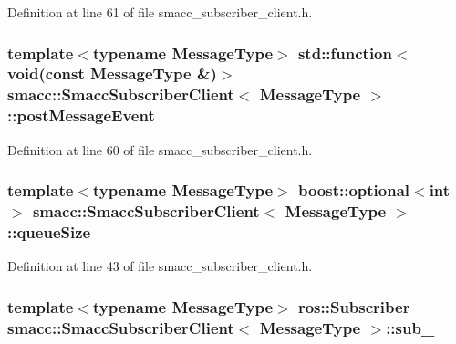 Definition at line 61 of file smacc\+\_\+subscriber\+\_\+client.\+h.

\subsubsection[{\texorpdfstring{post\+Message\+Event}{postMessageEvent}}]{\setlength{\rightskip}{0pt plus 5cm}template$<$typename Message\+Type$>$ std\+::function$<$void(const Message\+Type \&)$>$ {\bf smacc\+::\+Smacc\+Subscriber\+Client}$<$ Message\+Type $>$\+::post\+Message\+Event}\hypertarget{classsmacc_1_1SmaccSubscriberClient_ac131b24d58ff06791068f8dfd3401a0b}{}\label{classsmacc_1_1SmaccSubscriberClient_ac131b24d58ff06791068f8dfd3401a0b}


Definition at line 60 of file smacc\+\_\+subscriber\+\_\+client.\+h.

\subsubsection[{\texorpdfstring{queue\+Size}{queueSize}}]{\setlength{\rightskip}{0pt plus 5cm}template$<$typename Message\+Type$>$ boost\+::optional$<$int$>$ {\bf smacc\+::\+Smacc\+Subscriber\+Client}$<$ Message\+Type $>$\+::queue\+Size}\hypertarget{classsmacc_1_1SmaccSubscriberClient_ac8d4905509ecacb7c93d72c9acb9b6a1}{}\label{classsmacc_1_1SmaccSubscriberClient_ac8d4905509ecacb7c93d72c9acb9b6a1}


Definition at line 43 of file smacc\+\_\+subscriber\+\_\+client.\+h.

\subsubsection[{\texorpdfstring{sub\+\_\+}{sub_}}]{\setlength{\rightskip}{0pt plus 5cm}template$<$typename Message\+Type$>$ ros\+::\+Subscriber {\bf smacc\+::\+Smacc\+Subscriber\+Client}$<$ Message\+Type $>$\+::sub\+\_\+\hspace{0.3cm}{\ttfamily [private]}}\hypertarget{classsmacc_1_1SmaccSubscriberClient_a2a1c46e0ea0a2090a63232402b998518}{}\label{classsmacc_1_1SmaccSubscriberClient_a2a1c46e0ea0a2090a63232402b998518}



